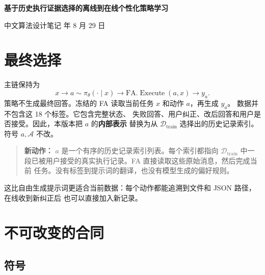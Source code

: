 \documentclass[11pt,UTF8,fontset=none]{ctexart}
\newcommand{\Dtrain}{\mathcal D_{\mathrm{train}}}
\newcommand{\policy}{\pi_{\theta}}
\newcommand{\FA}{\mathrm{FA}}
\begin{document}
\begin{center}
  {\LARGE\bfseries 基于历史执行证据选择的离线到在线个性化策略学习\par}
  \vspace{5pt}
  {\small 中文算法设计笔记  年 8 月 29 日}
\end{center}

\section{最终选择}
主链保持为
\begin{equation}
  x
  \longrightarrow
  a\sim\policy(\cdot\mid x)
  \longrightarrow
  \FA.\operatorname{Execute}(a,x)
  \longrightarrow
  y_a.
  \label{eq:chain}
\end{equation}
策略不生成最终回答。冻结的 FA 读取当前任务 \(x\) 和动作 \(a\)，再生成 \(y_a\)。
 数据并不包含这 18 个标签。它包含完整状态、
失败回答、用户纠正、改后回答和用户是否接受。因此，本版本把 \(a\) 的\textbf{内部表示}
替换为从 \(\Dtrain\) 选择出的历史记录索引。符号 \(a,\mathcal A\) 不改。

\begin{quote}
\textbf{新动作：} \(a\) 是一个有序的历史记录索引列表。每个索引都指向
\(\Dtrain\) 中一段已被用户接受的真实执行记录。FA 直接读取这些原始消息，然后完成当前
任务。没有标签到提示词的翻译，也没有模型生成的偏好规则。
\end{quote}

这比自由生成提示词更适合当前数据：每个动作都能追溯到文件和 JSON 路径，在线收到新纠正后
也可以直接加入新记录。

\section{不可改变的合同}

\subsection{符号}
\end{document}
